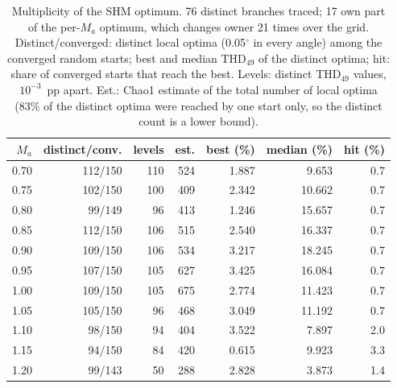 \begin{table}[!t]
\centering
\caption{Multiplicity of the SHM optimum. 76 distinct branches traced; 17 own part of the per-$M_a$ optimum, which changes owner 21 times over the grid. Distinct/converged: distinct local optima (0.05$^\circ$ in every angle) among the converged random starts; best and median THD$_{49}$ of the distinct optima; hit: share of converged starts that reach the best. Levels: distinct THD$_{49}$ values, $10^{-3}$~pp apart. Est.: Chao1 estimate of the total number of local optima (83\% of the distinct optima were reached by one start only, so the distinct count is a lower bound).}
\label{tab:multiplicity}
\footnotesize
\setlength{\tabcolsep}{4pt}
\begin{tabular}{rrrrrrr}
\toprule
$M_a$ & distinct/conv. & levels & est. & best (\%) & median (\%) & hit (\%) \\
\midrule
0.70 & 112/150 & 110 & 524 & 1.887 & 9.653 & 0.7 \\
0.75 & 102/150 & 100 & 409 & 2.342 & 10.662 & 0.7 \\
0.80 & 99/149 & 96 & 413 & 1.246 & 15.657 & 0.7 \\
0.85 & 112/150 & 106 & 515 & 2.540 & 16.337 & 0.7 \\
0.90 & 109/150 & 106 & 534 & 3.217 & 18.245 & 0.7 \\
0.95 & 107/150 & 105 & 627 & 3.425 & 16.084 & 0.7 \\
1.00 & 109/150 & 105 & 675 & 2.774 & 11.423 & 0.7 \\
1.05 & 105/150 & 96 & 468 & 3.049 & 11.192 & 0.7 \\
1.10 & 98/150 & 94 & 404 & 3.522 & 7.897 & 2.0 \\
1.15 & 94/150 & 84 & 420 & 0.615 & 9.923 & 3.3 \\
1.20 & 99/143 & 50 & 288 & 2.828 & 3.873 & 1.4 \\
\bottomrule
\end{tabular}
\end{table}
